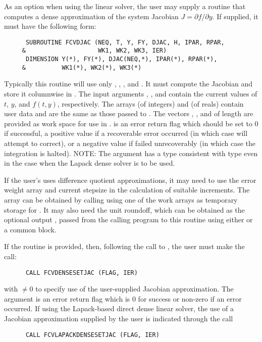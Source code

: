 \begin{Steps}
  As an option when using the {\dense} linear solver, the user may supply a
  routine that computes a dense approximation of the system Jacobian 
  $J = \partial f / \partial y$. If supplied, it must have the following form:
\begin{verbatim}
      SUBROUTINE FCVDJAC (NEQ, T, Y, FY, DJAC, H, IPAR, RPAR,
     &                    WK1, WK2, WK3, IER)
      DIMENSION Y(*), FY(*), DJAC(NEQ,*), IPAR(*), RPAR(*),
     &          WK1(*), WK2(*), WK3(*)
\end{verbatim}
  Typically this routine will use only , , , and . 
  It must compute the Jacobian and store it columnwise in .
  The input arguments , , and  contain the current
  values of $t$, $y$, and $f(t,y)$, respectively.
  The arrays  (of integers) and  (of reals) contain user data
  and are the same as those passed to .
  The vectors , , and 
  of length  are provided as work space for use in .
   is an error return flag which should be set to $0$ if successful, 
  a positive value if a recoverable error occurred (in which case {\cvode} will 
  attempt to correct), or a negative value if  failed unrecoverably 
  (in which case the integration is halted).
  NOTE: The argument  has a type consistent with {\CC} type 
  even in the case when the Lapack dense solver is to be used.

  If the user's  uses difference quotient approximations, it
  may need to use the error weight array  and current stepsize 
  in the calculation of suitable increments.  The array  can be
  obtained by calling  using one of the work arrays as
  temporary storage for .  It may also need the unit roundoff,
  which can be obtained as the optional output , passed from
  the calling program to this routine using either  or a common block.

  If the  routine is provided, then, following the call to , 
  the user must make the call:
\begin{verbatim}
      CALL FCVDENSESETJAC (FLAG, IER)
\end{verbatim}
  with  $\neq 0$ to specify use of the user-supplied Jacobian
  approximation.  The argument  is an error return flag which is $0$ 
  for success or non-zero if an error occurred.
  If using the Lapack-based direct dense linear solver, the use of a
  Jacobian approximation supplied by the user is indicated through the call
\begin{verbatim}
      CALL FCVLAPACKDENSESETJAC (FLAG, IER)
\end{verbatim}


\end{Steps}
